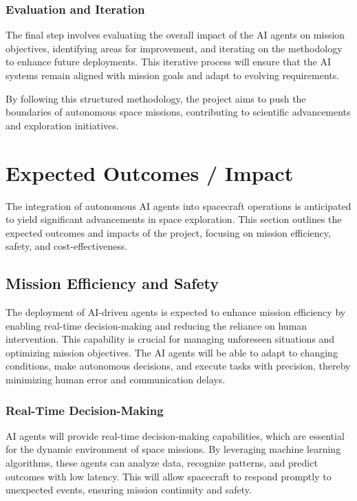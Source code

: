 \documentclass[a4paper, 11pt]{article}
\begin{document}
\subsubsection{Evaluation and Iteration}

The final step involves evaluating the overall impact of the AI agents on mission objectives, identifying areas for improvement, and iterating on the methodology to enhance future deployments. This iterative process will ensure that the AI systems remain aligned with mission goals and adapt to evolving requirements.

By following this structured methodology, the project aims to push the boundaries of autonomous space missions, contributing to scientific advancements and exploration initiatives.
\section{Expected Outcomes / Impact}

The integration of autonomous AI agents into spacecraft operations is anticipated to yield significant advancements in space exploration. This section outlines the expected outcomes and impacts of the project, focusing on mission efficiency, safety, and cost-effectiveness.

\subsection{Mission Efficiency and Safety}

The deployment of AI-driven agents is expected to enhance mission efficiency by enabling real-time decision-making and reducing the reliance on human intervention. This capability is crucial for managing unforeseen situations and optimizing mission objectives. The AI agents will be able to adapt to changing conditions, make autonomous decisions, and execute tasks with precision, thereby minimizing human error and communication delays.

\subsubsection{Real-Time Decision-Making}

AI agents will provide real-time decision-making capabilities, which are essential for the dynamic environment of space missions. By leveraging machine learning algorithms, these agents can analyze data, recognize patterns, and predict outcomes with low latency. This will allow spacecraft to respond promptly to unexpected events, ensuring mission continuity and safety.
\end{document}
